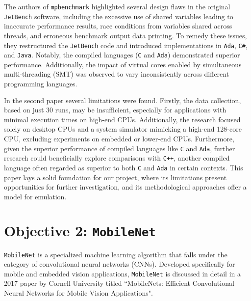 The authors of \texttt{mpbenchmark}\cite{mpbenchmark_paper} highlighted several design flaws in the original \texttt{JetBench} software\cite{JetBench_paper}, including the excessive use of shared variables leading to inaccurate performance results, race conditions from variables shared across threads, and erroneous benchmark output data printing. To remedy these issues, they restructured the \texttt{JetBench} code and introduced implementations in \texttt{Ada}, \texttt{C\#}, and \texttt{Java}. Notably, the compiled languages (\texttt{C} and \texttt{Ada}) demonstrated superior performance. Additionally, the impact of virtual cores enabled by simultaneous multi-threading (SMT) was observed to vary inconsistently across different programming languages.

In the second paper\cite{mpbenchmark_paper} several limitations were found. Firstly, the data collection, based on just 30 runs, may be insufficient, especially for applications with minimal execution times on high-end CPUs. Additionally, the research focused solely on desktop CPUs and a system simulator mimicking a high-end 128-core CPU, excluding experiments on embedded or lower-end CPUs. Furthermore, given the superior performance of compiled languages like \texttt{C} and \texttt{Ada}, further research could beneficially explore comparisons with \texttt{C++}, another compiled language often regarded as superior to both \texttt{C} and \texttt{Ada} in certain contexts. This paper lays a solid foundation for our project, where its limitations present opportunities for further investigation, and its methodological approaches offer a model for emulation.

\section{Objective 2: \texttt{MobileNet}}

\texttt{MobileNet} is a specialized machine learning algorithm that falls under the category of convolutional neural networks (CNNs). Developed specifically for mobile and embedded vision applications, \texttt{MobileNet} is discussed in detail in a 2017 paper by Cornell University titled ``MobileNets: Efficient Convolutional Neural Networks for Mobile Vision Applications"\cite{mobilenet_paper}. 


